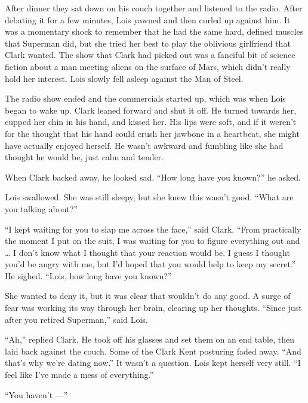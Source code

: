After dinner they sat down on his couch together and listened to the
radio. After debating it for a few minutes, Lois yawned and then curled
up against him. It was a momentary shock to remember that he had the
same hard, defined muscles that Superman did, but she tried her best to
play the oblivious girlfriend that Clark wanted. The show that Clark had
picked out was a fanciful bit of science fiction about a man meeting
aliens on the surface of Mars, which didn't really hold her interest.
Lois slowly fell asleep against the Man of Steel.

The radio show ended and the commercials started up, which was when Lois
began to wake up. Clark leaned forward and shut it off. He turned
towards her, cupped her chin in his hand, and kissed her. His lips were
soft, and if it weren't for the thought that his hand could crush her
jawbone in a heartbeat, she might have actually enjoyed herself. He
wasn't awkward and fumbling like she had thought he would be, just calm
and tender.

When Clark backed away, he looked sad. ``How long have you known?'' he
asked.

Lois swallowed. She was still sleepy, but she knew this wasn't good.
``What are you talking about?''

``I kept waiting for you to slap me across the face,'' said Clark.
``From practically the moment I put on the suit, I was waiting for you
to figure everything out and \ldots{} I don't know what I thought that
your reaction would be. I guess I thought you'd be angry with me, but
I'd hoped that you would help to keep my secret.'' He sighed. ``Lois,
how long have you known?''

She wanted to deny it, but it was clear that wouldn't do any good. A
surge of fear was working its way through her brain, clearing up her
thoughts. ``Since just after you retired Superman,'' said Lois.

``Ah,'' replied Clark. He took off his glasses and set them on an end
table, then laid back against the couch. Some of the Clark Kent
posturing faded away. ``And that's why we're dating now.'' It wasn't a
question. Lois kept herself very still. ``I feel like I've made a mess
of everything.''

``You haven't ---''


